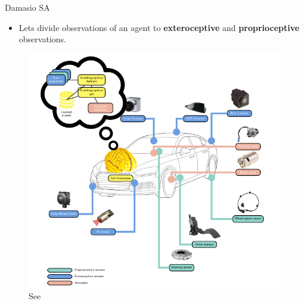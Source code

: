 \documentclass[unknownkeysallowed]{beamer}
\begin{document}
\begin{frame}{Damasio SA}
	\begin{itemize}
		\item Lets divide observations of an agent to \textbf{exteroceptive}
		and \textbf{proprioceptive} observations.
	\end{itemize}
	\begin{figure}
		\includegraphics[scale=0.3]{regazzoni-2020-multi-sensorial-generative-and-descriptive-self-awareness-models-for-autonomous-systems-fig-1.png}
		\caption{See \cite{regazzoni-2020-multi-sensorial-generative-and-descriptive-self-awareness-models-for-autonomous-systems}}
	\end{figure}
\end{frame}
\end{document}
